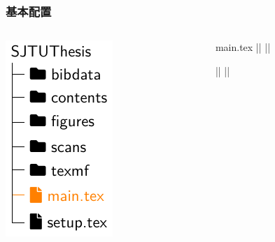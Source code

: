 \begin{frame}[fragile]
  \frametitle{基本配置}
  \begin{columns}
    \begin{column}{0.35\textwidth}
      \includegraphics[page=1]{support/figures/thesisdir.pdf}
    \end{column}
    \begin{column}{0.65\textwidth}



      \begin{codeblock}[firstnumber=12]{main.tex}
||%
||




||%
||\maketitle
      \end{codeblock}
    \end{column}
  \end{columns}
\end{frame}


